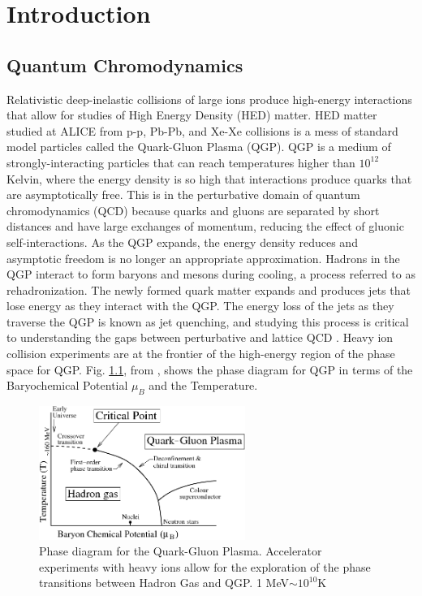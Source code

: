 \chapter{Introduction}

\section{Quantum Chromodynamics}
Relativistic deep-inelastic collisions of large ions produce high-energy interactions that allow for studies of High Energy Density (HED) matter. HED matter studied at ALICE from p-p, Pb-Pb, and Xe-Xe collisions is a mess of standard model particles called the Quark-Gluon Plasma (QGP). QGP is a medium of strongly-interacting particles that can reach temperatures higher than $10^{12}$ Kelvin, where the energy density is so high that interactions produce quarks that are asymptotically free. This is in the perturbative domain of quantum chromodynamics (QCD) because quarks and gluons are separated by short distances and have large exchanges of momentum, reducing the effect of gluonic self-interactions.
As the QGP expands, the energy density reduces and asymptotic freedom is no longer an appropriate approximation. Hadrons in the QGP interact to form baryons and mesons during cooling, a process referred to as rehadronization. The newly formed quark matter expands and produces jets that lose energy as they interact with the QGP. The energy loss of the jets as they traverse the QGP is known as jet quenching, and studying this process is critical to understanding the gaps between perturbative and lattice QCD \cite{QCD_Review}. Heavy ion collision experiments are at the frontier of the high-energy region of the phase space for QGP. Fig. \ref{fig:QGP_Phase_Diagram}, from \cite{QCDPhaseDiagram}, shows the phase diagram for QGP in terms of the Baryochemical Potential $\mu_B$ and the Temperature. 


\begin{figure}
    \centering
    \includegraphics[width=0.6\textwidth]{figures/ALICE/QGP_Phase_Diagram.png}
    \caption{Phase diagram for the Quark-Gluon Plasma. Accelerator experiments with heavy ions allow for the exploration of the phase transitions between Hadron Gas and QGP. 1 MeV$\sim 10^{10}$K 
    \cite{QCDPhaseDiagram}}
    \label{fig:QGP_Phase_Diagram}
\end{figure}


